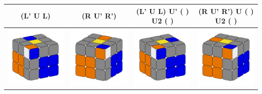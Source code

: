 \documentclass[12pt, a3paper]{article}
\newcommand{\scale}{1}
\begin{document}
\begin{center}
\begin{longtable}{c|c||c|c}
	(L' U L) & (R U' R') & (L' U L) U' ( ) U2 ( ) & (R U' R') U ( ) U2 ( ) \\
	\hline
	\hline
	\includegraphics[scale=\scale]{3l} & \includegraphics[scale=\scale]{3r}  &  \includegraphics[scale=\scale]{4l} & \includegraphics[scale=\scale]{4r} \\

\end{longtable}
\end{center}
\end{document}
